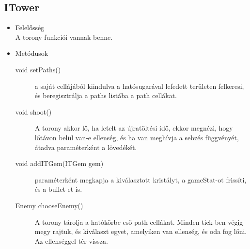 \subsection{ITower}
\begin{itemize}
\item Felelősség\\
A torony funkciói vannak benne.
\item Metódusok\\
	\begin{description}
		\item[void setPaths()] a saját cellájából kiindulva a hatósugarával lefedett területen felkeresi, és beregisztrálja a paths listába a path cellákat.
\item[void shoot()] A torony akkor lő, ha letelt az újratöltési idő, ekkor megnézi, hogy lőtávon belül van-e ellenség, és ha van meghívja a sebzés függvényét, átadva paraméterként a lövedékét. 
\item[void addITGem(ITGem gem)] paraméterként megkapja a kiválasztott kristályt, a gameStat-ot frissíti, és a bullet-et is.
\item[Enemy chooseEnemy()] A torony tárolja a hatókörbe eső path cellákat. Minden tick-ben végig megy rajtuk, és kiválaszt egyet, amelyiken van ellenség, és oda fog lőni. Az ellenséggel tér vissza.

		
		
	\end{description}
\end{itemize}

